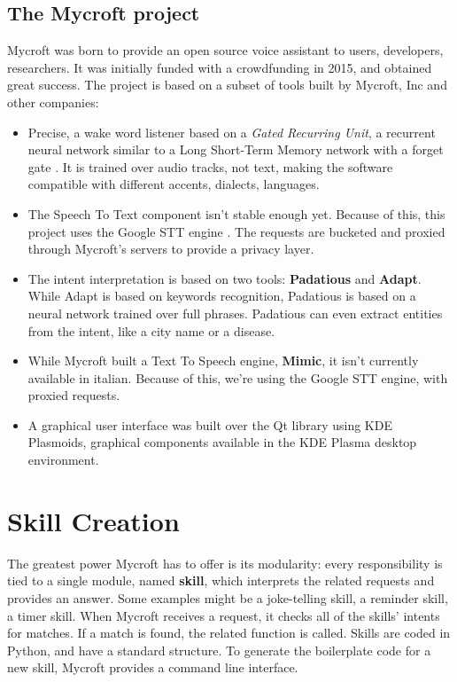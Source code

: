 \documentclass[conference]{IEEEtran}
\begin{document}
\subsection{The Mycroft project}
Mycroft was born to provide an open source voice assistant to users, developers, researchers.\cite{mycroft} It was initially funded with a crowdfunding in 2015, and obtained great success. The project is based on a subset of tools built by Mycroft, Inc and other companies:
\begin{itemize}
    \item Precise, a wake word listener based on a \textit{Gated Recurring Unit}, a recurrent neural network similar to a Long Short-Term Memory network with a forget gate \cite{GRU}. It is trained over audio tracks, not text, making the software compatible with different accents, dialects, languages.
    \item The Speech To Text component isn't stable enough yet. Because of this, this project uses the Google STT engine \cite{google-stt}. The requests are bucketed and proxied through Mycroft's servers to provide a privacy layer.
    \item The intent interpretation is based on two tools: \textbf{Padatious} and \textbf{Adapt}. While Adapt is based on keywords recognition, Padatious is based on a neural network trained over full phrases. Padatious can even extract entities from the intent, like a city name or a disease.
    \item While Mycroft built a Text To Speech engine, \textbf{Mimic}, it isn't currently available in italian. Because of this, we're using the Google STT engine, with proxied requests.
    \item A graphical user interface was built over the Qt library using KDE Plasmoids, graphical components available in the KDE Plasma desktop environment.
\end{itemize}
\section{Skill Creation}
\label{sec:skill-creation}
The greatest power Mycroft has to offer is its modularity: every responsibility is tied to a single module, named \textbf{skill}, which interprets the related requests and provides an answer. Some examples might be a joke-telling skill, a reminder skill, a timer skill. When Mycroft receives a request, it checks all of the skills' intents for matches. If a match is found, the related function is called.
Skills are coded in Python, and have a standard structure. To generate the boilerplate code for a new skill, Mycroft provides a command line interface.
\end{document}
